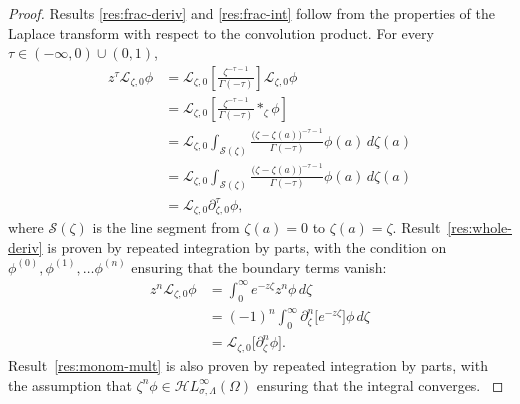 \documentclass{article}
\newcommand{\singexp}[2]{\mathcal{H}L^\infty_{#1, #2}}
\newcommand{\fracderiv}[3]{\partial^{#1}_{#2, #3}}
\newcommand{\laplace}{\mathcal{L}}
\theoremstyle{definition}
\theoremstyle{plain}
\newenvironment{revised}{\color{DarkBlue}}{\color{black}}
\newenvironment{revised}{}{}
\begin{document}
\begin{proof}
   
Results \ref{res:frac-deriv} and \ref{res:frac-int} follow from the properties of the Laplace transform with respect to the convolution product. For every $\tau \in (-\infty, 0) \cup (0,1)$,
\begin{revised}
\begin{align*}
z^\tau\laplace_{\zeta,0}\phi&=\laplace_{\zeta,0}\left[\frac{\zeta^{-\tau-1}}{\Gamma(-\tau)}\right] \laplace_{\zeta,0}\phi\\
&=\laplace_{\zeta,0}\left[\frac{\zeta^{-\tau-1}}{\Gamma(-\tau)} \ast_\zeta \phi\right] \\
&=\laplace_{\zeta,0} \int_{\mathcal{S}(\zeta)}\frac{\big(\zeta-\zeta(a)\big)^{-\tau-1}}{\Gamma(-\tau)} \phi(a)\,d\zeta(a)\\
&=\laplace_{\zeta,0} \int_{\mathcal{S}(\zeta) }\frac{\big(\zeta-\zeta(a)\big)^{-\tau-1}}{\Gamma(-\tau)} \phi(a)\,d\zeta(a)\\
&=\laplace_{\zeta,0}\fracderiv{\tau}{\zeta}{0}\phi,
\end{align*}
where $\mathcal{S}(\zeta)$ is the line segment from $\zeta(a)=0$ to $\zeta(a) = \zeta$. Result~\ref{res:whole-deriv} is proven by repeated integration by parts, with the condition on $\phi^{(0)}, \phi^{(1)}, \ldots \phi^{(n)}$ ensuring that the boundary terms vanish:
\begin{align*}
    z^n\laplace_{\zeta,0}\phi&=\int_0^\infty e^{-z\zeta} z^n \phi \, d\zeta\\
    &=(-1)^n\int_0^\infty \partial_\zeta^n \big[e^{-z\zeta}\big]  \phi\, d\zeta\\
    &=\laplace_{\zeta,0}\big[\partial_\zeta^n \phi\big].
\end{align*}
Result~\ref{res:monom-mult} is also proven by repeated integration by parts, with the assumption that $\zeta^n\phi\in\singexp{\sigma}{\Lambda}(\Omega)$ ensuring that the integral converges.
\end{revised}
\end{proof}
\end{document}

